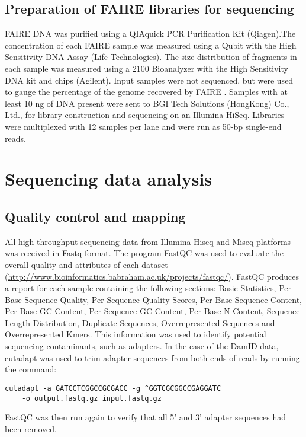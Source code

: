 \subsection{Preparation of FAIRE libraries for sequencing}
FAIRE DNA was purified using a QIAquick PCR Purification Kit (Qiagen).The concentration of each FAIRE sample was measured using a Qubit with the High Sensitivity DNA Assay (Life Technologies). The size distribution of fragments in each sample was measured using a 2100 Bioanalyzer with the High Sensitivity DNA kit and chips (Agilent). Input samples were not sequenced, but were used to gauge the percentage of the genome recovered by FAIRE \citep{simon_using_2012}. Samples with at least 10 ng of DNA present were sent to BGI Tech Solutions (HongKong) Co., Ltd., for library construction and sequencing on an Illumina HiSeq. Libraries were multiplexed with 12 samples per lane and were run as 50-bp single-end reads.

\section{Sequencing data analysis} 
\subsection{Quality control and mapping}
All high-throughput sequencing data from Illumina Hiseq and Miseq platforms was received in Fastq format. The program FastQC was used to evaluate the overall quality and attributes of each dataset (\url{http://www.bioinformatics.babraham.ac.uk/projects/fastqc/}). FastQC produces a report for each sample containing the following sections: Basic Statistics, Per Base Sequence Quality, Per Sequence Quality Scores, Per Base Sequence Content, Per Base GC Content, Per Sequence GC Content, Per Base N Content, Sequence Length Distribution, Duplicate Sequences, Overrepresented Sequences and Overrepresented Kmers. This information was used to identify potential sequencing contaminants, such as adapters. In the case of the DamID data, cutadapt was used to trim adapter sequences from both ends of reads by running the command:

\begin{lstlisting}
cutadapt -a GATCCTCGGCCGCGACC -g ^GGTCGCGGCCGAGGATC 
	-o output.fastq.gz input.fastq.gz
\end{lstlisting}

FastQC was then run again to verify that all 5' and 3' adapter sequences had been removed.\\ 

